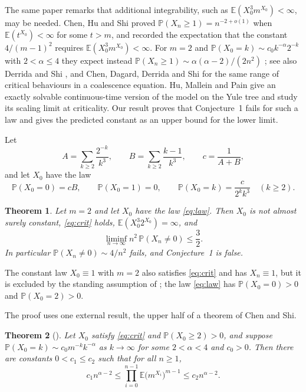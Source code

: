 \documentclass[11pt]{amsart}
\newtheorem{theorem}{Theorem}[section]
\theoremstyle{definition}
\theoremstyle{remark}
\numberwithin{equation}{section}
\newcommand{\Pp}{\mathbb P}
\newcommand{\E}{\mathbb E}
\begin{document}
The same paper remarks that additional integrability, such as $\E(X_0^3m^{X_0})<\infty$, may be needed. Chen, Hu and Shi \cite{CHS} proved $\Pp(X_n\ge1)=n^{-2+o(1)}$ when $\E(t^{X_0})<\infty$ for some $t>m$, and recorded the expectation that the constant $4/(m-1)^2$ requires $\E(X_0^3m^{X_0})<\infty$. For $m=2$ and $\Pp(X_0=k)\sim c_0k^{-\alpha}2^{-k}$ with $2<\alpha\le4$ they expect instead $\Pp(X_n\ge1)\sim \alpha(\alpha-2)/(2n^2)$ \cite[(1.5)]{CHS}; see also Derrida and Shi \cite{DS}, and Chen, Dagard, Derrida and Shi \cite{CDDS} for the same range of critical behaviours in a coalescence equation. Hu, Mallein and Pain \cite{HMP} give an exactly solvable continuous-time version of the model on the Yule tree and study its scaling limit at criticality. Our result proves that Conjecture~1 fails for such a law and gives the predicted constant as an upper bound for the lower limit.

Let
\[
A=\sum_{k\ge2}\frac{2^{-k}}{k^3},\qquad B=\sum_{k\ge2}\frac{k-1}{k^3},\qquad c=\frac1{A+B},
\]
and let $X_0$ have the law
\begin{equation}\label{eq:law}
\Pp(X_0=0)=cB,\qquad \Pp(X_0=1)=0,\qquad \Pp(X_0=k)=\frac{c}{2^kk^3}\quad(k\ge2).
\end{equation}

\begin{theorem}\label{thm:main}
Let $m=2$ and let $X_0$ have the law \eqref{eq:law}. Then $X_0$ is not almost surely constant, \eqref{eq:crit} holds, $\E(X_0^3 2^{X_0})=\infty$, and
\[
\liminf_{n\to\infty} n^2\,\Pp(X_n\ne0)\le \frac32 .
\]
In particular $\Pp(X_n\ne0)\sim 4/n^2$ fails, and Conjecture~1 is false.
\end{theorem}

The constant law $X_0\equiv1$ with $m=2$ also satisfies \eqref{eq:crit} and has $X_n\equiv1$, but it is excluded by the standing assumption of \cite{CDHLS}; the law \eqref{eq:law} has $\Pp(X_0=0)>0$ and $\Pp(X_0=2)>0$.

The proof uses one external result, the upper half of a theorem of Chen and Shi.

\begin{theorem}[{\cite[Theorem~1.1]{CS}}]\label{thm:CS}
Let $X_0$ satisfy \eqref{eq:crit} and $\Pp(X_0\ge2)>0$, and suppose $\Pp(X_0=k)\sim c_0m^{-k}k^{-\alpha}$ as $k\to\infty$ for some $2<\alpha<4$ and $c_0>0$. Then there are constants $0<c_1\le c_2$ such that for all $n\ge1$,
\[
c_1n^{\alpha-2}\le\prod_{i=0}^{n-1}\E\bigl(m^{X_i}\bigr)^{m-1}\le c_2n^{\alpha-2}.
\]
\end{theorem}
\end{document}
